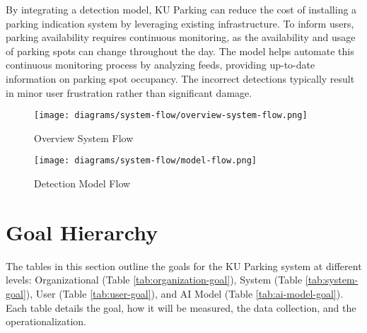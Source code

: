 By integrating a detection model, KU Parking can reduce the cost of installing a parking indication system by leveraging existing infrastructure. To inform users, parking availability requires continuous monitoring, as the availability and usage of parking spots can change throughout the day. The model helps automate this continuous monitoring process by analyzing feeds, providing up-to-date information on parking spot occupancy. The incorrect detections typically result in minor user frustration rather than significant damage.

\begin{figure}[H]
    \centering
    \texttt{[image: diagrams/system-flow/overview-system-flow.png]}
    \caption{Overview System Flow}
    \label{fig:overview-system-flow}
\end{figure}

\begin{figure}[H]
    \centering
    \texttt{[image: diagrams/system-flow/model-flow.png]}
    \caption{Detection Model Flow}
    \label{fig:model-flow}
\end{figure}

\clearpage
\section{Goal Hierarchy}
\label{section:goal-hierarchy}

The tables in this section outline the goals for the KU Parking system at different levels: Organizational (Table \ref{tab:organization-goal}), System (Table \ref{tab:system-goal}), User (Table \ref{tab:user-goal}), and AI Model (Table \ref{tab:ai-model-goal}). Each table details the goal, how it will be measured, the data collection, and the operationalization.

\begin{table}[H]\caption{Organizational Goals of KU Parking}
    \label{tab:organization-goal}
    \centering
\end{table}

